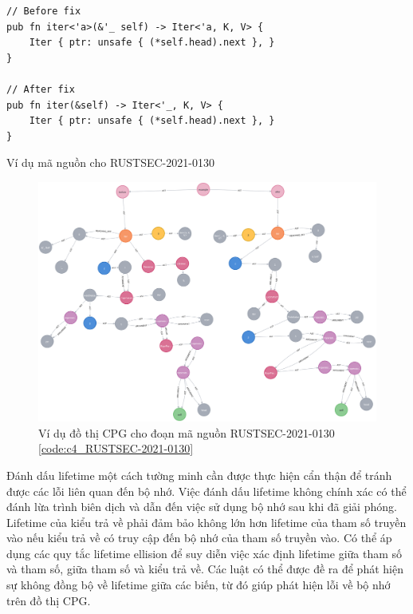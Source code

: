 \begin{listing}[H]
\begin{verbatim}
// Before fix
pub fn iter<'a>(&'_ self) -> Iter<'a, K, V> {
    Iter { ptr: unsafe { (*self.head).next }, }
}

// After fix
pub fn iter(&self) -> Iter<'_, K, V> {
    Iter { ptr: unsafe { (*self.head).next }, }
}
\end{verbatim}
\caption{Ví dụ mã nguồn cho RUSTSEC-2021-0130}
\label{code:c4_RUSTSEC-2021-0130}
\end{listing}

\begin{figure}[H]
    \includegraphics[width=1\columnwidth]{figures/c4/c4_RUSTSEC-2021-0130.png}
    \centering
    \caption{Ví dụ đồ thị CPG cho đoạn mã nguồn RUSTSEC-2021-0130 \ref{code:c4_RUSTSEC-2021-0130}}
    \label{img:c4_RUSTSEC-2021-0130}
\end{figure}

Đánh dấu lifetime một cách tường minh cần được thực hiện cẩn thận để tránh được các lỗi liên quan đến bộ nhớ.
Việc đánh dấu lifetime không chính xác có thể đánh lừa trình biên dịch và dẫn đến việc sử dụng bộ nhớ sau khi đã giải phóng.
Lifetime của kiểu trả về phải đảm bảo không lớn hơn lifetime của tham số truyền vào nếu kiểu trả về có truy cập đến bộ nhớ của tham số truyền vào.
Có thể áp dụng các quy tắc lifetime ellision để suy diễn việc xác định lifetime giữa tham số và tham số, giữa tham số và kiểu trả về.
Các luật có thể được đề ra để phát hiện sự không đồng bộ về lifetime giữa các biến, từ đó giúp phát hiện lỗi về bộ nhớ trên đồ thị CPG.
